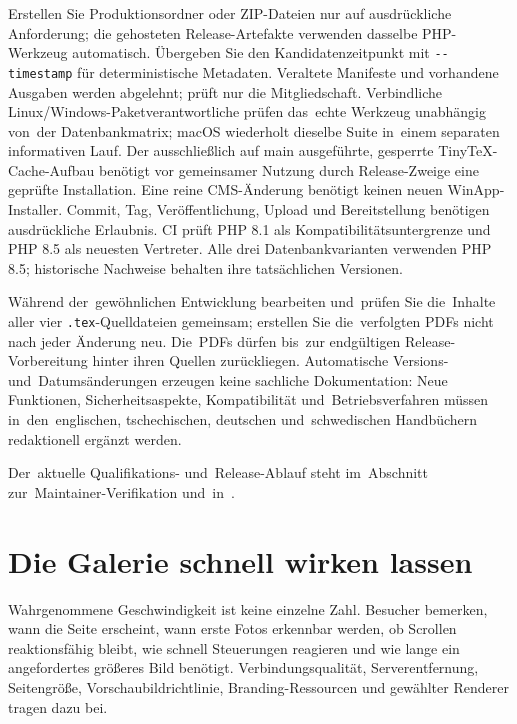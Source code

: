 \documentclass[11pt,a4paper]{article}
\newcommand{\filepath}[1]{\path{#1}}
\newcommand{\codeword}[1]{\nolinkurl{#1}}
\begin{document}
Erstellen Sie Produktionsordner oder ZIP-Dateien nur auf ausdrückliche
Anforderung; die gehosteten Release-Artefakte verwenden dasselbe PHP-Werkzeug
automatisch. Übergeben Sie den Kandidatenzeitpunkt mit \codeword{--timestamp}
für deterministische Metadaten. Veraltete Manifeste und vorhandene Ausgaben
werden abgelehnt; \filepath{scripts/release_files.php} prüft nur die
Mitgliedschaft. Verbindliche Linux/Windows-Paketverantwortliche prüfen das~echte
Werkzeug unabhängig von~der Datenbankmatrix; macOS wiederholt dieselbe Suite
in~einem separaten informativen Lauf. Der ausschließlich auf main ausgeführte,
gesperrte TinyTeX-Cache-Aufbau benötigt vor gemeinsamer Nutzung durch
Release-Zweige eine geprüfte Installation. Eine reine CMS-Änderung benötigt
keinen neuen WinApp-Installer. Commit, Tag, Veröffentlichung, Upload und
Bereitstellung benötigen ausdrückliche Erlaubnis. CI prüft PHP 8.1 als
Kompatibilitätsuntergrenze und PHP 8.5 als neuesten Vertreter. Alle drei
Datenbankvarianten verwenden PHP 8.5; historische Nachweise behalten ihre
tatsächlichen Versionen.

Während der~gewöhnlichen Entwicklung bearbeiten und~prüfen Sie die~Inhalte aller
vier \codeword{.tex}-Quelldateien gemeinsam; erstellen Sie die~verfolgten PDFs
nicht nach jeder Änderung neu. Die~PDFs dürfen bis~zur endgültigen
Release-Vorbereitung hinter ihren Quellen zurückliegen. Automatische Versions-
und~Datumsänderungen erzeugen keine sachliche Dokumentation: Neue Funktionen,
Sicherheitsaspekte, Kompatibilität und~Betriebsverfahren müssen
in~den~englischen, tschechischen, deutschen und~schwedischen Handbüchern
redaktionell ergänzt werden.

Der~aktuelle Qualifikations- und~Release-Ablauf steht im~Abschnitt
zur~Maintainer-Verifikation und~in~\filepath{RELEASE.md}.

\section{Die Galerie schnell wirken lassen}
\label{sec:performance}

Wahrgenommene Geschwindigkeit ist keine einzelne Zahl. Besucher bemerken, wann
die Seite erscheint, wann erste Fotos erkennbar werden, ob Scrollen
reaktionsfähig bleibt, wie schnell Steuerungen reagieren und wie lange ein
angefordertes größeres Bild benötigt. Verbindungsqualität, Serverentfernung,
Seitengröße, Vorschaubildrichtlinie, Branding-Ressourcen und gewählter Renderer
tragen dazu bei.
\end{document}
